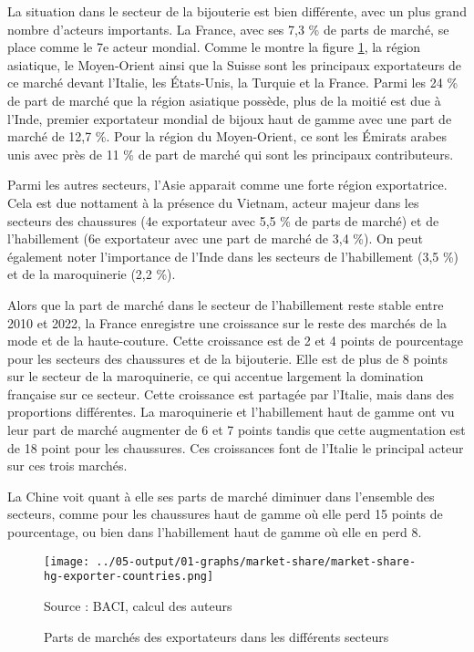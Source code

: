 \documentclass[french,10pt,a4paper]{article}
\begin{document}
La situation dans le secteur de la bijouterie est bien différente, avec un plus grand nombre d'acteurs importants. La France, avec ses 7,3 \% de parts de marché, se place comme le 7e acteur mondial. Comme le montre la figure \ref{fig:market-share}, la région asiatique, le Moyen-Orient ainsi que la Suisse sont les principaux exportateurs de ce marché devant l'Italie, les États-Unis, la Turquie et la France. Parmi les 24 \% de part de marché que la région asiatique possède, plus de la moitié est due à l'Inde, premier exportateur mondial de bijoux haut de gamme avec une part de marché de 12,7 \%. Pour la région du Moyen-Orient, ce sont les Émirats arabes unis avec près de 11 \% de part de marché qui sont les principaux contributeurs.

Parmi les autres secteurs, l'Asie apparait comme une forte région exportatrice. Cela est due nottament à la présence du Vietnam, acteur majeur dans les secteurs des chaussures (4e exportateur avec 5,5 \% de parts de marché) et de l'habillement (6e exportateur avec une part de marché de 3,4 \%). On peut également noter l'importance de l'Inde dans les secteurs de l'habillement (3,5 \%) et de la maroquinerie (2,2 \%).

\bigskip

Alors que la part de marché dans le secteur de l'habillement reste stable entre 2010 et 2022, la France enregistre une croissance sur le reste des marchés de la mode et de la haute-couture. Cette croissance est de 2 et 4 points de pourcentage pour les secteurs des chaussures et de la bijouterie. Elle est de plus de 8 points sur le secteur de la maroquinerie, ce qui accentue largement la domination française sur ce secteur. Cette croissance est partagée par l'Italie, mais dans des proportions différentes. La maroquinerie et l'habillement haut de gamme ont vu leur part de marché augmenter de 6 et 7 points tandis que cette augmentation est de 18 point pour les chaussures. Ces croissances font de l'Italie le principal acteur sur ces trois marchés.

La Chine voit quant à elle ses parts de marché diminuer dans l'ensemble des secteurs, comme pour les chaussures haut de gamme où elle perd 15 points de pourcentage, ou bien dans l'habillement haut de gamme où elle en perd 8.

\begin{figure}[!h]
  \centering
  \texttt{[image: ../05-output/01-graphs/market-share/market-share-hg-exporter-countries.png]}
  \captionsetup{justification=raggedright,singlelinecheck=false, font=small}
  \caption*{Source : BACI, calcul des auteurs}
  \captionsetup{justification=centering, singlelinecheck=true, font=normalsize}
  \caption{Parts de marchés des exportateurs dans les différents secteurs}
  \label{fig:market-share}
\end{figure}
\end{document}
